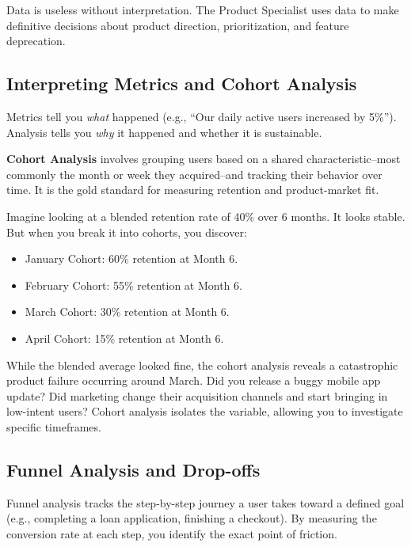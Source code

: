 \documentclass[
  11pt,
  openany,
  oneside]{book}
\providecommand{\tightlist}{%
  \setlength{\itemsep}{0pt}\setlength{\parskip}{0pt}}
\begin{document}
Data is useless without interpretation. The Product Specialist uses data
to make definitive decisions about product direction, prioritization,
and feature deprecation.

\subsection{Interpreting Metrics and Cohort
Analysis}\label{interpreting-metrics-and-cohort-analysis}

Metrics tell you \emph{what} happened (e.g., ``Our daily active users
increased by 5\%''). Analysis tells you \emph{why} it happened and
whether it is sustainable.

\textbf{Cohort Analysis} involves grouping users based on a shared
characteristic--most commonly the month or week they acquired--and
tracking their behavior over time. It is the gold standard for measuring
retention and product-market fit.

Imagine looking at a blended retention rate of 40\% over 6 months. It
looks stable. But when you break it into cohorts, you discover:

\begin{itemize}
\tightlist
\item
  January Cohort: 60\% retention at Month 6.
\item
  February Cohort: 55\% retention at Month 6.
\item
  March Cohort: 30\% retention at Month 6.
\item
  April Cohort: 15\% retention at Month 6.
\end{itemize}

While the blended average looked fine, the cohort analysis reveals a
catastrophic product failure occurring around March. Did you release a
buggy mobile app update? Did marketing change their acquisition channels
and start bringing in low-intent users? Cohort analysis isolates the
variable, allowing you to investigate specific timeframes.

\subsection{Funnel Analysis and
Drop-offs}\label{funnel-analysis-and-drop-offs}

Funnel analysis tracks the step-by-step journey a user takes toward a
defined goal (e.g., completing a loan application, finishing a
checkout). By measuring the conversion rate at each step, you identify
the exact point of friction.
\end{document}

